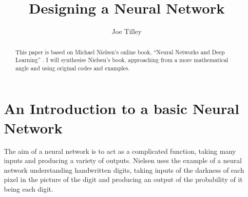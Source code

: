 \documentclass[10pt]{article}
\begin{document}
\title{Designing a Neural Network}
\author{Joe Tilley}
\maketitle

\begin{abstract}
	This paper is based on Michael Nielsen's online book, ``Neural Networks and Deep Learning'' \cite{nielsen}. I will synthesise Nielsen's book, approaching from a more mathematical angle and using original codes and examples.
\end{abstract}

\section{An Introduction to a basic Neural Network}
The aim of a neural network is to act as a complicated function, taking many inputs and producing a variety of outputs. Nielsen uses the example of a neural network understanding handwritten digits, taking inputs of the darkness of each pixel in the picture of the digit and producing an output of the probability of it being each digit.
\end{document}
